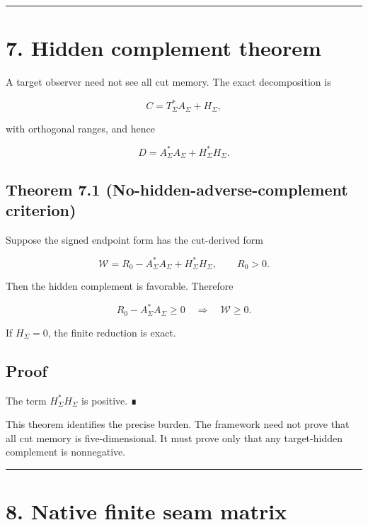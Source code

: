 \begin{center}\rule{0.5\linewidth}{0.5pt}\end{center}

\hypertarget{hidden-complement-theorem}{%
\section{7. Hidden complement theorem}\label{hidden-complement-theorem}}

A target observer need not see all cut memory. The exact decomposition is

\[
C=T_\Sigma^*A_\Sigma+H_\Sigma,
\]

with orthogonal ranges, and hence

\[
D=A_\Sigma^*A_\Sigma+H_\Sigma^*H_\Sigma.
\]

\hypertarget{theorem-7.1-no-hidden-adverse-complement-criterion}{%
\subsection{Theorem 7.1 (No-hidden-adverse-complement criterion)}\label{theorem-7.1-no-hidden-adverse-complement-criterion}}

Suppose the signed endpoint form has the cut-derived form

\[
\mathcal W
=R_0-A_\Sigma^*A_\Sigma+H_\Sigma^*H_\Sigma,
\qquad
R_0>0.
\]

Then the hidden complement is favorable. Therefore

\[
R_0-A_\Sigma^*A_\Sigma\ge0
\quad\Longrightarrow\quad
\mathcal W\ge0.
\]

If \(H_\Sigma=0\), the finite reduction is exact.

\hypertarget{proof-4}{%
\subsection{Proof}\label{proof-4}}

The term \(H_\Sigma^*H_\Sigma\) is positive. ∎

This theorem identifies the precise burden. The framework need not prove that
all cut memory is five-dimensional. It must prove only that any target-hidden
complement is nonnegative.

\begin{center}\rule{0.5\linewidth}{0.5pt}\end{center}

\hypertarget{native-finite-seam-matrix}{%
\section{8. Native finite seam matrix}\label{native-finite-seam-matrix}}

